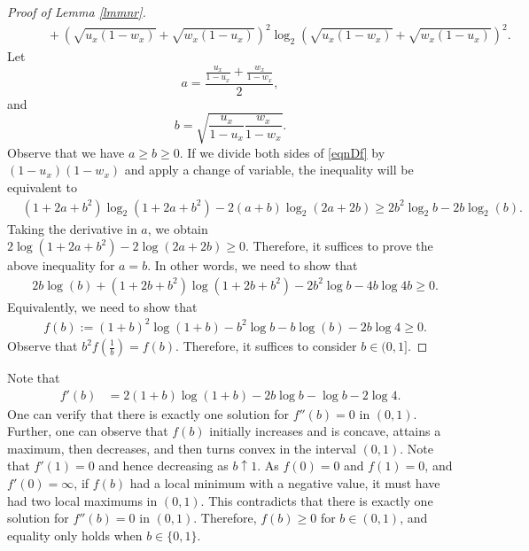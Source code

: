 \documentclass[conference,letterpaper,onecolumn]{IEEEtran}
\theoremstyle{plain}%
\begin{document}
\begin{proof}[Proof of Lemma \ref{lmmnr}]
{\begin{align}
    &\qquad+ \left(\sqrt{u_x(1-w_x)} + \sqrt{w_x(1-u_x)}\right)^2\log_2\left(\sqrt{u_x(1-w_x)} + \sqrt{w_x(1-u_x)}\right)^2.
\label{eqnDf}
\end{align}}
Let 
$$a=\frac{\frac{u_x}{1-u_x}+\frac{w_x}{1-w_x}}{2},$$ and $$b=\sqrt{\frac{u_x}{1-u_x}\frac{w_x}{1-w_x}}.$$
Observe that we have $a \geq b\geq 0$. If we divide both sides of \eqref{eqnDf} by $(1-u_x)(1-w_x)$ and apply a change of variable, the inequality will be equivalent to 
\begin{align*}
   & (1+2a+b^2) \log_2 (1+2a+b^2)  - 2(a+b) \log_2(2a+2b)\geq 2b^2 \log_2b - 2b \log_2(b).
\end{align*}
Taking the derivative in $a$, we obtain
$2\log(1+2a+b^2) - 2\log(2a+2b) \geq 0. $ Therefore, it suffices to prove the above inequality for $a=b$. In other words, we need to show that
{\begin{align*}
   &  2b \log(b) + (1+2b+b^2) \log (1+2b+b^2) - 2b^2 \log b - 4b \log4b \geq 0.
\end{align*}}
Equivalently, we need to show that
{\begin{align*}
   &  f(b):=(1+b)^2 \log (1+b) - b^2 \log b -  b \log (b) - 2b \log4 \geq 0.
\end{align*}}
Observe that
$b^2 f\left(\frac{1}{b}\right) = f(b)$. Therefore, it suffices to consider $b \in (0,1]$.
\end{proof}



Note that
\begin{align*}
    f'(b) &= 2(1+b)\log(1+b) - 2b\log b - \log b - 2 \log 4.
\end{align*}
One can verify that there is exactly one solution for $f''(b)=0$ in $(0,1)$.
Further, one can observe that $f(b)$ initially increases and is concave, attains a maximum, then decreases, and then turns convex in the interval $(0,1)$. Note that $f'(1)=0$ and hence decreasing as $b \uparrow 1$. As $f(0)=0$ and $f(1)=0$, and $f'(0)=\infty$, if $f(b)$ had a local minimum with a negative value, it must have had two local maximums in $(0,1)$. This contradicts that there is exactly one solution for $f''(b)=0$ in $(0,1)$. Therefore, $f(b) \geq 0$ for $b \in (0,1)$, and equality only holds when $b \in \{0,1\}.$
\end{document}
